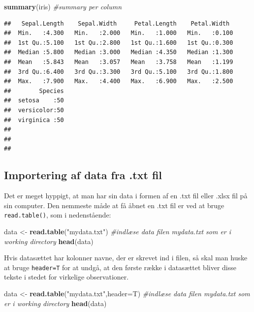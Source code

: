 \documentclass[
]{book}
\newenvironment{Shaded}{\begin{snugshade}}{\end{snugshade}}
\newcommand{\AttributeTok}[1]{\textcolor[rgb]{0.13,0.29,0.53}{#1}}
\newcommand{\CommentTok}[1]{\textcolor[rgb]{0.56,0.35,0.01}{\textit{#1}}}
\newcommand{\FunctionTok}[1]{\textcolor[rgb]{0.13,0.29,0.53}{\textbf{#1}}}
\newcommand{\NormalTok}[1]{#1}
\newcommand{\OtherTok}[1]{\textcolor[rgb]{0.56,0.35,0.01}{#1}}
\newcommand{\StringTok}[1]{\textcolor[rgb]{0.31,0.60,0.02}{#1}}
\theoremstyle{definition}
\theoremstyle{definition}
\theoremstyle{definition}
\theoremstyle{definition}
\theoremstyle{remark}
\begin{document}
\begin{Shaded}
\begin{Highlighting}[]
\FunctionTok{summary}\NormalTok{(iris) }\CommentTok{\#summary per column}
\end{Highlighting}
\end{Shaded}

\begin{verbatim}
##   Sepal.Length    Sepal.Width     Petal.Length    Petal.Width   
##  Min.   :4.300   Min.   :2.000   Min.   :1.000   Min.   :0.100  
##  1st Qu.:5.100   1st Qu.:2.800   1st Qu.:1.600   1st Qu.:0.300  
##  Median :5.800   Median :3.000   Median :4.350   Median :1.300  
##  Mean   :5.843   Mean   :3.057   Mean   :3.758   Mean   :1.199  
##  3rd Qu.:6.400   3rd Qu.:3.300   3rd Qu.:5.100   3rd Qu.:1.800  
##  Max.   :7.900   Max.   :4.400   Max.   :6.900   Max.   :2.500  
##        Species  
##  setosa    :50  
##  versicolor:50  
##  virginica :50  
##                 
##                 
## 
\end{verbatim}

\subsection{Importering af data fra .txt fil}\label{importering-af-data-fra-.txt-fil}

Det er meget hyppigt, at man har sin data i formen af en .txt fil eller .xlsx fil på sin computer. Den nemmeste måde at få åbnet en .txt fil er ved at bruge \texttt{read.table()}, som i nedenstående:

\begin{Shaded}
\begin{Highlighting}[]
\NormalTok{data }\OtherTok{\textless{}{-}} \FunctionTok{read.table}\NormalTok{(}\StringTok{"mydata.txt"}\NormalTok{) }\CommentTok{\#indlæse data filen mydata.txt som er i working directory}
\FunctionTok{head}\NormalTok{(data)}
\end{Highlighting}
\end{Shaded}

Hvis datasættet har kolonner navne, der er skrevet ind i filen, så skal man huske at bruge \texttt{header=T} for at undgå, at den første række i datasættet bliver disse tekste i stedet for virkelige observationer.

\begin{Shaded}
\begin{Highlighting}[]
\NormalTok{data }\OtherTok{\textless{}{-}} \FunctionTok{read.table}\NormalTok{(}\StringTok{"mydata.txt"}\NormalTok{,}\AttributeTok{header=}\NormalTok{T) }\CommentTok{\#indlæse data filen mydata.txt som er i working directory}
\FunctionTok{head}\NormalTok{(data)}
\end{Highlighting}
\end{Shaded}
\end{document}
